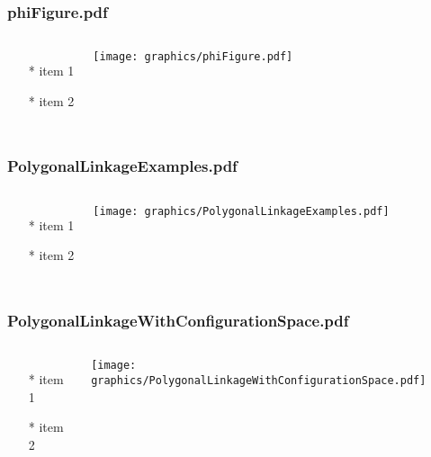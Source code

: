 \documentclass{beamer}
\begin{document}
\begin{frame} \frametitle{phiFigure.pdf}
    \begin{columns}[c]
        \begin{itemize}
            \item[*] item 1
            \item[*] item 2
        \end{itemize}
        \begin{minipage}{\linewidth}
            \begin{center}
            \texttt{[image: graphics/phiFigure.pdf]}
            \label{gfx:phiFigure.pdf}
            \end{center}
        \end{minipage}
    \end{columns}
\end{frame}
\begin{frame} \frametitle{PolygonalLinkageExamples.pdf}
    \begin{columns}[c]
        \begin{itemize}
            \item[*] item 1
            \item[*] item 2
        \end{itemize}
        \begin{minipage}{\linewidth}
            \begin{center}
            \texttt{[image: graphics/PolygonalLinkageExamples.pdf]}
            \label{gfx:PolygonalLinkageExamples.pdf}
            \end{center}
        \end{minipage}
    \end{columns}
\end{frame}
\begin{frame} \frametitle{PolygonalLinkageWithConfigurationSpace.pdf}
    \begin{columns}[c]
        \begin{itemize}
            \item[*] item 1
            \item[*] item 2
        \end{itemize}
        \begin{minipage}{\linewidth}
            \begin{center}
            \texttt{[image: graphics/PolygonalLinkageWithConfigurationSpace.pdf]}
            \label{gfx:PolygonalLinkageWithConfigurationSpace.pdf}
            \end{center}
        \end{minipage}
    \end{columns}
\end{frame}
\end{document}
